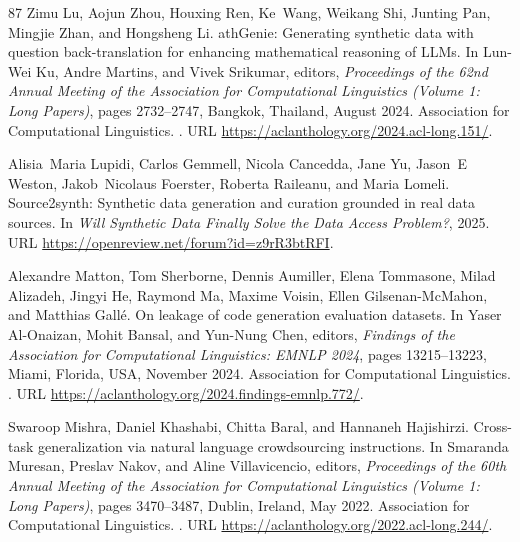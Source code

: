 \begin{thebibliography}{87}
Zimu Lu, Aojun Zhou, Houxing Ren, Ke~Wang, Weikang Shi, Junting Pan, Mingjie Zhan, and Hongsheng Li.
ath{G}enie: Generating synthetic data with question back-translation for enhancing mathematical reasoning of {LLM}s.
\newblock In Lun-Wei Ku, Andre Martins, and Vivek Srikumar, editors, \emph{Proceedings of the 62nd Annual Meeting of the Association for Computational Linguistics (Volume 1: Long Papers)}, pages 2732--2747, Bangkok, Thailand, August 2024. Association for Computational Linguistics.
\newblock {}.
\newblock URL \url{https://aclanthology.org/2024.acl-long.151/}.

Alisia~Maria Lupidi, Carlos Gemmell, Nicola Cancedda, Jane Yu, Jason~E Weston, Jakob~Nicolaus Foerster, Roberta Raileanu, and Maria Lomeli.
\newblock Source2synth: Synthetic data generation and curation grounded in real data sources.
\newblock In \emph{Will Synthetic Data Finally Solve the Data Access Problem?}, 2025.
\newblock URL \url{https://openreview.net/forum?id=z9rR3btRFI}.

Alexandre Matton, Tom Sherborne, Dennis Aumiller, Elena Tommasone, Milad Alizadeh, Jingyi He, Raymond Ma, Maxime Voisin, Ellen Gilsenan-McMahon, and Matthias Gall{\'e}.
\newblock On leakage of code generation evaluation datasets.
\newblock In Yaser Al-Onaizan, Mohit Bansal, and Yun-Nung Chen, editors, \emph{Findings of the Association for Computational Linguistics: EMNLP 2024}, pages 13215--13223, Miami, Florida, USA, November 2024. Association for Computational Linguistics.
\newblock {}.
\newblock URL \url{https://aclanthology.org/2024.findings-emnlp.772/}.

Swaroop Mishra, Daniel Khashabi, Chitta Baral, and Hannaneh Hajishirzi.
\newblock Cross-task generalization via natural language crowdsourcing instructions.
\newblock In Smaranda Muresan, Preslav Nakov, and Aline Villavicencio, editors, \emph{Proceedings of the 60th Annual Meeting of the Association for Computational Linguistics (Volume 1: Long Papers)}, pages 3470--3487, Dublin, Ireland, May 2022. Association for Computational Linguistics.
\newblock {}.
\newblock URL \url{https://aclanthology.org/2022.acl-long.244/}.


\end{thebibliography}
